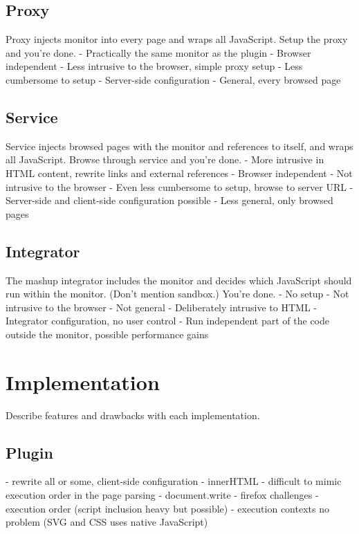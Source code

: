 \documentclass{llncs}
\begin{document}
\subsection{Proxy}

Proxy injects monitor into every page and wraps all JavaScript. Setup the proxy 
and you're done.
- Practically the same monitor as the plugin
- Browser independent
- Less intrusive to the browser, simple proxy setup
- Less cumbersome to setup
- Server-side configuration
- General, every browsed page

\subsection{Service}

Service injects browsed pages with the monitor and references to itself, and 
wraps all JavaScript. Browse through service and you're done.
- More intrusive in HTML content, rewrite links and external references 
- Browser independent
- Not intrusive to the browser
- Even less cumbersome to setup, browse to server URL
- Server-side and client-side configuration possible
- Less general, only browsed pages

\subsection{Integrator}

The mashup integrator includes the monitor and decides which JavaScript should 
run within the monitor. (Don't mention sandbox.) You're done.
- No setup
- Not intrusive to the browser
- Not general
- Deliberately intrusive to HTML
- Integrator configuration, no user control
- Run independent part of the code outside the monitor, possible performance gains


\section{Implementation}
\label{sec:impl}

Describe features and drawbacks with each implementation.

\subsection{Plugin}

- rewrite all or some, client-side configuration
- innerHTML
- difficult to mimic execution order in the page parsing
- document.write
- firefox challenges
- execution order (script inclusion heavy but possible)
- execution contexts no problem (SVG and CSS uses native JavaScript)
\end{document}
